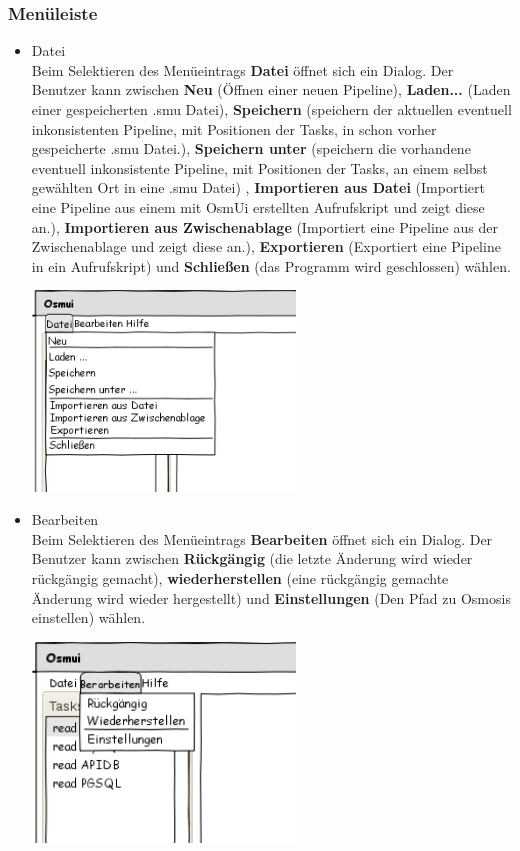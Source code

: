 \documentclass[a4paper,12pt]{scrartcl}
\begin{document}
\subsubsection{Menüleiste}
\begin{itemize}
\item Datei\\
Beim Selektieren des Menüeintrags \textbf{Datei} öffnet sich ein Dialog. Der Benutzer kann zwischen \textbf{Neu} (Öffnen einer neuen Pipeline), \textbf{Laden...} (Laden einer gespeicherten .smu Datei), \textbf{Speichern} (speichern der aktuellen eventuell inkonsistenten Pipeline, mit Positionen der Tasks, in schon vorher gespeicherte .smu Datei.), \textbf{Speichern unter} (speichern die vorhandene eventuell inkonsistente Pipeline, mit Positionen der Tasks, an einem selbst gewählten Ort in eine .smu Datei) , \textbf{Importieren aus Datei} (Importiert eine Pipeline aus einem mit OsmUi erstellten Aufrufskript und zeigt diese an.), \textbf{Importieren aus Zwischenablage} (Importiert eine Pipeline aus der Zwischenablage und zeigt diese an.), \textbf{Exportieren} (Exportiert eine Pipeline in ein Aufrufskript) und \textbf{Schließen} (das Programm wird geschlossen) wählen. 
\\ 
\begin{center}
\includegraphics[width=7cm]{ui_prototype/OsmUi_Dateiklein.png}
\end{center}
\item Bearbeiten\\
Beim Selektieren des Menüeintrags \textbf{Bearbeiten} öffnet sich ein Dialog. Der Benutzer kann zwischen \textbf{Rückgängig} (die letzte Änderung wird wieder rückgängig gemacht), \textbf{wiederherstellen} (eine rückgängig gemachte Änderung wird wieder hergestellt) und \textbf{Einstellungen} (Den Pfad zu Osmosis einstellen) wählen.
\\
\begin{center}
\includegraphics[width=7cm]{ui_prototype/OsmUi_Bearbeitenklein.png}

\end{center}
\end{itemize}
\end{document}
